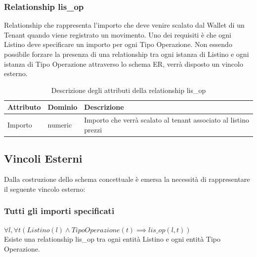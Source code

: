 \subsubsection{Relationship lis\_op}
Relationship che rappresenta l'importo che deve venire scalato dal Wallet di un Tenant quando viene registrato un movimento.
Uno dei requisiti \`e che ogni Listino deve specificare un importo per ogni Tipo Operazione. Non essendo possibile forzare la presenza di una relationship tra ogni
istanza di Listino e ogni istanza di Tipo Operazione attraverso lo schema ER, verr\`a disposto un vincolo esterno.

\begin{table}[H]
  \centering
  \caption{Descrizione degli attributi della relationship lis\_op}
  \begin{tabulary}{\textwidth}{p{2.3cm}p{2.3cm}L}
    \toprule
    \textbf{Attributo} & \textbf{Dominio} & \textbf{Descrizione} \\
    \midrule
    Importo & numeric & Importo che verr\`a scalato al tenant associato al listino prezzi\\\bottomrule
  \end{tabulary}
\end{table}

\subsection{Vincoli Esterni}
Dalla costruzione dello schema concettuale \`e emersa la necessit\`a di rappresentare il seguente vincolo esterno:
\subsubsection{\label{tuttiimporticoncept}Tutti gli importi specificati}
$ \forall l, \forall t (Listino(l) \land TipoOperazione(t) \implies lis\_op(l, t)) $\\
Esiste una relationship lis\_op tra ogni entit\`a Listino e ogni entit\`a Tipo Operazione.

